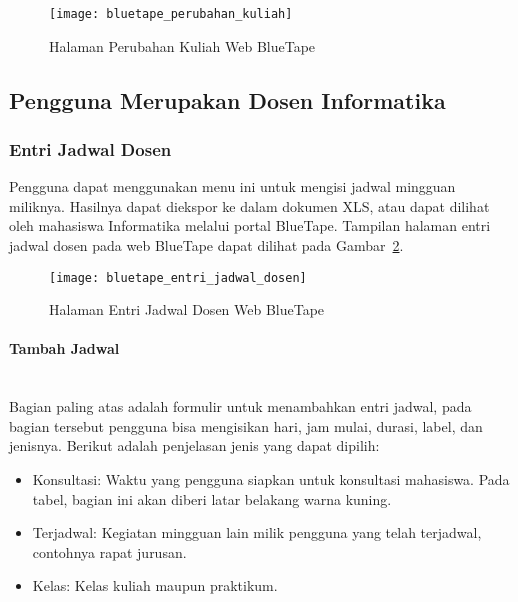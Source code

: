 \begin{figure}[H]
    \centering  
    \texttt{[image: bluetape\_perubahan\_kuliah]}
    \caption[Halaman Perubahan Kuliah Web BlueTape]{Halaman Perubahan Kuliah Web BlueTape}
    \label{fig:bluetape_perubahan_kuliah}
\end{figure}

\subsection{Pengguna Merupakan Dosen Informatika}
\label{sec:bluetape_dosen_informatika}

\subsubsection{Entri Jadwal Dosen}
\label{sec:bluetape_entri_jadwal_dosen}
Pengguna dapat menggunakan menu ini untuk mengisi jadwal mingguan miliknya. Hasilnya dapat diekspor ke dalam dokumen XLS, atau dapat dilihat oleh mahasiswa Informatika melalui portal BlueTape. Tampilan halaman entri jadwal dosen pada web BlueTape dapat dilihat pada \mbox{Gambar \ref{fig:bluetape_entri_jadwal_dosen}}.

\begin{figure}[H]
    \centering  
    \texttt{[image: bluetape\_entri\_jadwal\_dosen]}
    \caption[Halaman Entri Jadwal Dosen Web BlueTape]{Halaman Entri Jadwal Dosen Web BlueTape}
    \label{fig:bluetape_entri_jadwal_dosen}
\end{figure}

\paragraph{Tambah Jadwal}
\label{sec:bluetape_tambah_jadwal}
\phantom{blank}\\

Bagian paling atas adalah formulir untuk menambahkan entri jadwal, pada bagian tersebut pengguna bisa mengisikan hari, jam mulai, durasi, label, dan jenisnya. Berikut adalah penjelasan jenis yang dapat dipilih:
\begin{itemize}
	\item Konsultasi: Waktu yang pengguna siapkan untuk konsultasi mahasiswa. Pada tabel, bagian ini akan diberi latar belakang warna kuning.
	\item Terjadwal: Kegiatan mingguan lain milik pengguna yang telah terjadwal, contohnya rapat jurusan.
	\item Kelas: Kelas kuliah maupun praktikum.
\end{itemize}

